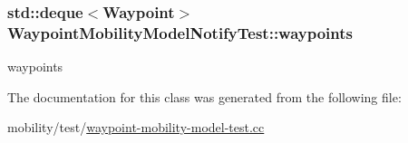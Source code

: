 \subsubsection[{\texorpdfstring{waypoints}{waypoints}}]{\setlength{\rightskip}{0pt plus 5cm}std\+::deque$<${\bf Waypoint}$>$ Waypoint\+Mobility\+Model\+Notify\+Test\+::waypoints\hspace{0.3cm}{\ttfamily [private]}}\hypertarget{classWaypointMobilityModelNotifyTest_a2224442f76c902f6f20cf467bbd48914}{}\label{classWaypointMobilityModelNotifyTest_a2224442f76c902f6f20cf467bbd48914}


waypoints 



The documentation for this class was generated from the following file\+:\begin{DoxyCompactItemize}
\item 
mobility/test/\hyperlink{waypoint-mobility-model-test_8cc}{waypoint-\/mobility-\/model-\/test.\+cc}\end{DoxyCompactItemize}

